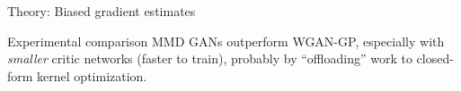 \documentclass[xcolor={table}]{beamer}
\begin{document}
\begin{frame}{}
\begin{columns}[T, totalwidth=\textwidth]
\begin{column}{.32\textwidth}
\begin{block}{Theory: Biased gradient estimates}
\begin{itemize}
      \end{itemize}
    \end{block}
    \vspace*{-1.5ex}
    \begin{block}{Experimental comparison}
      MMD GANs outperform WGAN-GP, especially with \emph{smaller} critic networks (faster to train),
      probably by ``offloading'' work to closed-form kernel optimization.
    \end{block}
    \vspace*{-1.3cm}


\end{column}
\end{columns}
\end{frame}
\end{document}

